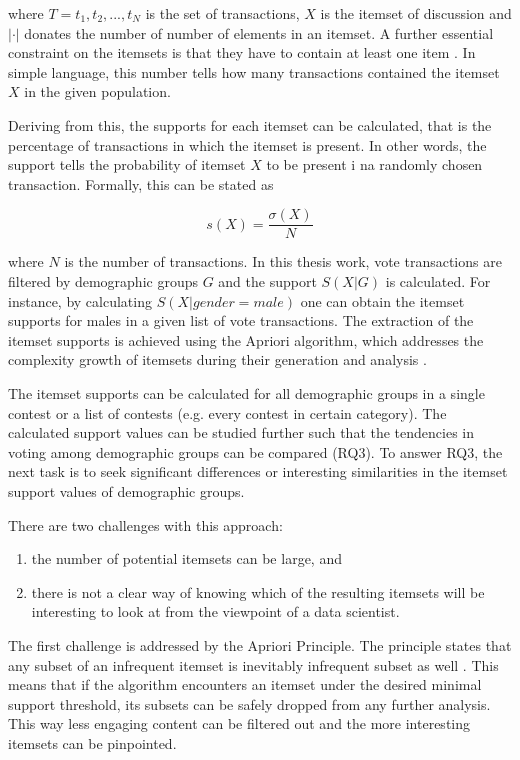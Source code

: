 where $T = {t_1, t_2, ..., t_N}$ is the set of transactions, $X$ is the itemset of discussion and $| \cdot |$ donates the number of number of elements in an itemset. A further essential constraint on the itemsets is that they have to contain at least one item \cite{introtodatamining}. In simple language, this number tells how many transactions contained the itemset $X$ in the given population.

Deriving from this, the supports for each itemset can be calculated, that is the percentage of transactions in which the itemset is present. In other words, the support tells the probability of itemset $X$ to be present i na randomly chosen transaction. Formally, this can be stated as 

\begin{equation}
    s(X) = \frac{\sigma (X)}{N}
\end{equation}

where $N$ is the number of transactions. In this thesis work, vote transactions are filtered by demographic groups $G$ and the support $S(X|G)$ is calculated. For instance, by calculating $S(X|gender = male)$ one can obtain the itemset supports for males in a given list of vote transactions. The extraction of the itemset supports is achieved using the Apriori algorithm, which addresses the complexity growth of itemsets during their generation and analysis \cite{introtodatamining}. 

The itemset supports can be calculated for all demographic groups in a single contest or a list of contests (e.g. every contest in certain category). The calculated support values can be studied further such that the tendencies in voting among demographic groups can be compared (RQ3). To answer RQ3, the next task is to seek significant differences or interesting similarities in the itemset support values of demographic groups. 

There are two challenges with this approach: 
\begin{enumerate}
    \item the number of potential itemsets can be large, and
    \item there is not a clear way of knowing which of the resulting itemsets will be interesting to look at from the viewpoint of a data scientist.
\end{enumerate} 

The first challenge is addressed by the Apriori Principle. The principle states that any subset of an infrequent itemset is inevitably infrequent subset as well \cite{introtodatamining}. This means that if the algorithm encounters an itemset under the desired minimal support threshold, its subsets can be safely dropped from any further analysis. This way less engaging content can be filtered out and the more interesting itemsets can be pinpointed. 


